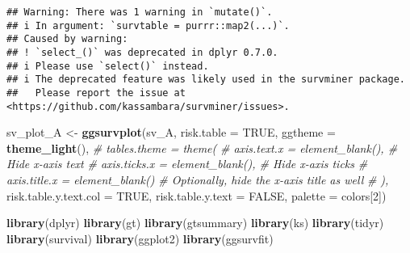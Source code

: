 \documentclass[
]{article}
\newenvironment{Shaded}{\begin{snugshade}}{\end{snugshade}}
\newcommand{\AttributeTok}[1]{\textcolor[rgb]{0.13,0.29,0.53}{#1}}
\newcommand{\CommentTok}[1]{\textcolor[rgb]{0.56,0.35,0.01}{\textit{#1}}}
\newcommand{\ConstantTok}[1]{\textcolor[rgb]{0.56,0.35,0.01}{#1}}
\newcommand{\DecValTok}[1]{\textcolor[rgb]{0.00,0.00,0.81}{#1}}
\newcommand{\FunctionTok}[1]{\textcolor[rgb]{0.13,0.29,0.53}{\textbf{#1}}}
\newcommand{\NormalTok}[1]{#1}
\newcommand{\OtherTok}[1]{\textcolor[rgb]{0.56,0.35,0.01}{#1}}
\begin{document}
\begin{verbatim}
## Warning: There was 1 warning in `mutate()`.
## i In argument: `survtable = purrr::map2(...)`.
## Caused by warning:
## ! `select_()` was deprecated in dplyr 0.7.0.
## i Please use `select()` instead.
## i The deprecated feature was likely used in the survminer package.
##   Please report the issue at <https://github.com/kassambara/survminer/issues>.
\end{verbatim}

\begin{Shaded}
\begin{Highlighting}[]
\NormalTok{sv\_plot\_A }\OtherTok{\textless{}{-}} \FunctionTok{ggsurvplot}\NormalTok{(sv\_A, }\AttributeTok{risk.table =} \ConstantTok{TRUE}\NormalTok{,}
                      \AttributeTok{ggtheme =} \FunctionTok{theme\_light}\NormalTok{(),}
                      \CommentTok{\# tables.theme = theme(}
                      \CommentTok{\#   axis.text.x = element\_blank(),  \# Hide x{-}axis text}
                      \CommentTok{\#   axis.ticks.x = element\_blank(), \# Hide x{-}axis ticks}
                      \CommentTok{\#   axis.title.x = element\_blank()  \# Optionally, hide the x{-}axis title as well}
                      \CommentTok{\# ),}
                      \AttributeTok{risk.table.y.text.col =} \ConstantTok{TRUE}\NormalTok{,}
                      \AttributeTok{risk.table.y.text =} \ConstantTok{FALSE}\NormalTok{,}
                      \AttributeTok{palette =}\NormalTok{ colors[}\DecValTok{2}\NormalTok{])  }

\FunctionTok{library}\NormalTok{(dplyr)}
\FunctionTok{library}\NormalTok{(gt)}
\FunctionTok{library}\NormalTok{(gtsummary)}
\FunctionTok{library}\NormalTok{(ks)}
\FunctionTok{library}\NormalTok{(tidyr)}
\FunctionTok{library}\NormalTok{(survival)}
\FunctionTok{library}\NormalTok{(ggplot2)}
\FunctionTok{library}\NormalTok{(ggsurvfit)}



\end{Highlighting}
\end{Shaded}
\end{document}
